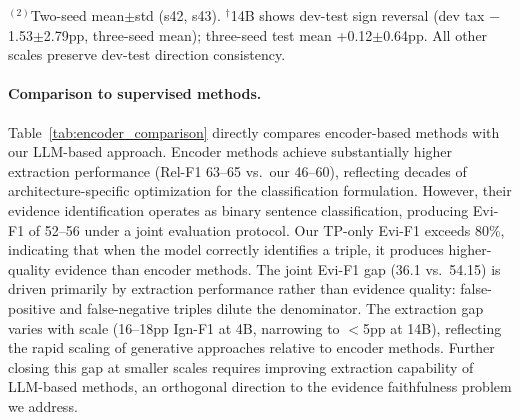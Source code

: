 \begin{table}[t]
\centering
\caption{RSFT inference-time evidence tax on Re-DocRED test set (Ign-F1 \%). Tax $=$ no-evi $-$ with-evi; positive $=$ cost. Per-seed s42 except where noted.}
\label{tab:rsft_test_tax}
\small
{}
\vspace{1mm}
{\raggedright\footnotesize $^{(2)}$Two-seed mean$\pm$std (s42, s43). $^\dagger$14B shows dev-test sign reversal (dev tax $-$1.53$\pm$2.79pp, three-seed mean); three-seed test mean +0.12$\pm$0.64pp. All other scales preserve dev-test direction consistency.\par}
\end{table}

\paragraph{Comparison to supervised methods.}
Table~\ref{tab:encoder_comparison} directly compares encoder-based methods with our LLM-based approach. Encoder methods achieve substantially higher extraction performance (Rel-F1 63--65 vs.\ our 46--60), reflecting decades of architecture-specific optimization for the classification formulation. However, their evidence identification operates as binary sentence classification, producing Evi-F1 of 52--56 under a joint evaluation protocol. Our TP-only Evi-F1 exceeds 80\%, indicating that when the model correctly identifies a triple, it produces higher-quality evidence than encoder methods. The joint Evi-F1 gap (36.1 vs.\ 54.15) is driven primarily by extraction performance rather than evidence quality: false-positive and false-negative triples dilute the denominator. The extraction gap varies with scale (16--18pp Ign-F1 at 4B, narrowing to $<$5pp at 14B), reflecting the rapid scaling of generative approaches relative to encoder methods. Further closing this gap at smaller scales requires improving extraction capability of LLM-based methods, an orthogonal direction to the evidence faithfulness problem we address.

